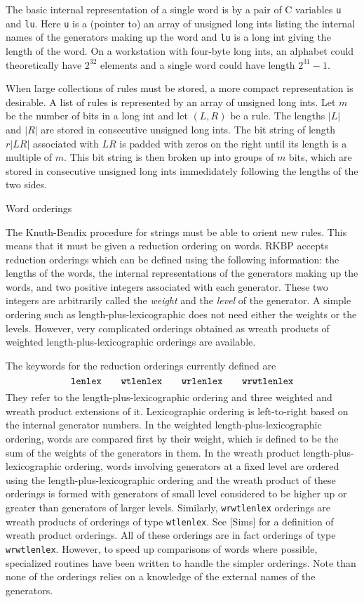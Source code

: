 The basic internal representation of a single word is by a pair of C
variables {\tt u} and {\tt lu}.  Here {\tt u} is a (pointer to) an
array of unsigned long ints listing the internal names of the
generators making up the word and {\tt lu} is a long int giving the
length of the word.  On a workstation with four-byte long ints, an
alphabet could theoretically have $2^{32}$ elements and a single word
could have length $2^{31}-1$.

When large collections of rules must be stored, a more compact
representation is desirable.  A list of rules is represented by an
array of unsigned long ints.  Let $m$ be the number of bits in a long
int and let $(L,R)$ be a rule.  The lengths $|L|$ and $|R|$ are stored
in consecutive unsigned long ints.  The bit string of length $r|LR|$
associated with $LR$ is padded with zeros on the right until its length
is a multiple of $m$.  This bit string is then broken up into groups of
$m$ bits, which are stored in consecutive unsigned long ints
immedidately following the lengths of the two sides.

\bigskip

  Word orderings

\nobreak

The Knuth-Bendix procedure for strings must be able to orient new
rules. This means that it must be given a reduction ordering on words.
RKBP accepts reduction orderings which can be defined using the
following information: the lengths of the words, the internal
representations of the generators making up the words, and two
positive integers associated with each generator. These two integers
are arbitrarily called the {\it weight} and the {\it level} of the
generator. A simple ordering such as length-plus-lexicographic does
not need either the weights or the levels. However, very complicated
orderings obtained as wreath products of weighted
length-plus-lexicographic orderings are available.

The keywords for the reduction orderings currently defined are
$${\tt lenlex\qquad wtlenlex\qquad wrlenlex\qquad wrwtlenlex}$$
\noindent They refer to the length-plus-lexicographic
ordering and three weighted and wreath product extensions of it.
Lexicographic ordering is left-to-right based on the internal
generator numbers. In the weighted length-plus-lexicographic ordering,
words are compared first by their weight, which is defined to be the
sum of the weights of the generators in them. In the wreath product
length-plus-lexicographic ordering, words involving generators at a
fixed level are ordered using the length-plus-lexicographic ordering
and the wreath product of these orderings is formed with generators of
small level considered to be higher up or greater than generators of
larger levels. Similarly, {\tt wrwtlenlex} orderings are wreath
products of orderings of type {\tt wtlenlex}. See [Sims] for a
definition of wreath product orderings. All of these orderings are in
fact orderings of type {\tt wrwtlenlex}.  However, to speed up
comparisons of words where possible, specialized routines have been
written to handle the simpler orderings. Note than none of the
orderings relies on a knowledge of the external names of the generators.

